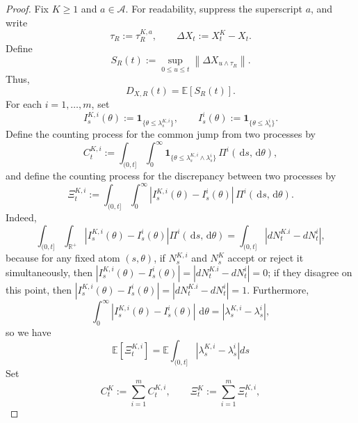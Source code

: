 \documentclass[11pt]{article}
\theoremstyle{remarkitalic}
\theoremstyle{remarkitalic}
\newcommand{\E}{\mathbb E}
\newcommand{\dd}{\,\mathrm d}
\newcommand{\1}{\mathbf 1}
\newcommand{\norm}[1]{\left\lVert #1 \right\rVert}
\newcommand{\abs}[1]{\left\lvert #1\right\rvert}
\begin{document}
{\begin{proof}
Fix $K\geq1$ and $a\in\mathcal A$. For readability, suppress the
superscript $a$, and write
\[
    \tau_R:=\tau_R^{K,a},
    \qquad
    \Delta X_t:=X_t^K-X_t.
\]
Define
\[
S_R(t)
:=
\sup_{0\leq u\leq t}
\norm{\Delta X_{u\wedge\tau_R}}.
\]
Thus,
\[
    D_{X,R}(t)=\E[S_R(t)].
\] For each $i=1,\ldots,m$, set
\[
I_s^{K,i}(\theta)
:=
\mathbf 1_{\{\theta\leq\lambda_s^{K,i}\}},
\qquad
I_s^i(\theta)
:=
\mathbf 1_{\{\theta\leq\lambda_s^i\}}.
\]
Define the counting process for the common jump from two processes by
\[
C_t^{K,i}
:=
\int_{(0,t]}\int_0^\infty
\mathbf 1_{\{
    \theta\leq
    \lambda_s^{K,i}\wedge\lambda_s^i
\}}
\,\Pi^i(\dd s,\dd\theta),
\]
and define the counting process for the discrepancy between two processes by
\[
\Xi_t^{K,i}
:=
\int_{(0,t]}\int_0^\infty
\left|
    I_s^{K,i}(\theta)-I_s^i(\theta)
\right|
\,\Pi^i(\dd s,\dd\theta).
\] Indeed, 
\begin{equation*}
        \int_{(0,t]}\int_{\mathbb R^+}\left|I_s^{K,i}(\theta) - I_s^i(\theta)\right|\Pi^i(\dd s,\dd\theta) =\int_{(0,t]}|dN_t^{K.i} - dN_t^i|,
\end{equation*} because for any fixed atom $(s,\theta)$, if $N^{K,i}_s$ and $N^K_s$ accept or reject it simultaneously, then $\left|I_s^{K,i}(\theta) - I_s^i(\theta)\right| = |dN_t^{K.i} - dN_t^i| = 0$; if they disagree on this point, then $\left|I_s^{K,i}(\theta) - I_s^i(\theta)\right| = |dN_t^{K.i} - dN_t^i| = 1$. Furthermore, \[\int_0^\infty
\left|
    I_s^{K,i}(\theta)-I_s^i(\theta)
\right|
\,\dd\theta
=
\abs{\lambda_s^{K,i}-\lambda_s^i},\] so we have 
\begin{equation}
    \label{eq:discrepancy_intensity}
    \mathbb E[\Xi_t^{K,i}] = \mathbb E\int_{(0,t]}\abs{\lambda_s^{K,i}-\lambda_s^i}ds
\end{equation}
Set
\[
C_t^K:=\sum_{i=1}^m C_t^{K,i},
\qquad
\Xi_t^K:=\sum_{i=1}^m \Xi_t^{K,i},
\] 


\end{proof}}
\end{document}
